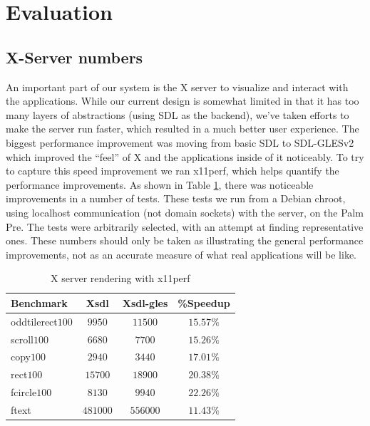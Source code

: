 \section{Evaluation}
\label{sec:eval}

\subsection{X-Server numbers}

An important part of our system is the X server to visualize and interact with the applications.  While our current design is somewhat limited in that it has too many layers of abstractions (using SDL as the backend), we've taken efforts to make the server run faster, which resulted in a much better user experience.  The biggest  performance improvement was moving from basic SDL to SDL-GLESv2 which improved the ``feel'' of X and the applications inside of it noticeably.  To try to capture this speed improvement we ran x11perf, which helps quantify the performance improvements.  As shown in Table \ref{tab:x_results}, there was noticeable improvements in a number of tests.
These tests we run from a Debian chroot, using localhost communication (not domain sockets) with the server, on the Palm Pre.  The tests were arbitrarily selected, with an attempt at finding representative ones.  These numbers should only be taken as illustrating the general performance improvements, not as an accurate measure of what real applications will be like.

\begin{table}[ht]
{\small
\hfill{}
\begin{tabular}{|l|c|c|c|}
\hline Benchmark & Xsdl & Xsdl-gles & \%Speedup \\ [2pt] 
\hline oddtilerect$100$ & $9950$ & $11500$ & $15.57\%$ \\ [2pt]
scroll$100$ & $6680$ & $7700$ & $15.26\%$ \\ [2pt]
copy$100$ & $2940$ & $3440$ & $17.01\%$ \\ [2pt]
rect$100$ & $15700$ & $18900$ & $20.38\%$ \\ [2pt]
fcircle$100$ & $8130$ & $9940$ & $22.26\%$ \\ [2pt]
ftext & $481000$ & $556000$ & $11.43\%$ \\ [2pt]
\hline 
\end{tabular}}
\hfill{}
\caption{ X server rendering with x11perf }
\label{tab:x_results}
\end{table}

